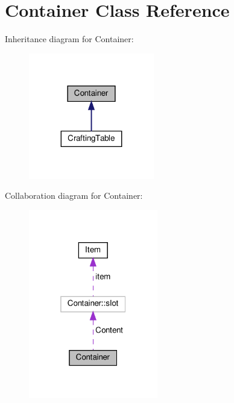 \hypertarget{classContainer}{}\section{Container Class Reference}
\label{classContainer}


Inheritance diagram for Container\+:
\nopagebreak
\begin{figure}[H]
\begin{center}
\leavevmode
\includegraphics[width=155pt]{classContainer__inherit__graph}
\end{center}
\end{figure}


Collaboration diagram for Container\+:
\nopagebreak
\begin{figure}[H]
\begin{center}
\leavevmode
\includegraphics[width=160pt]{classContainer__coll__graph}
\end{center}
\end{figure}
